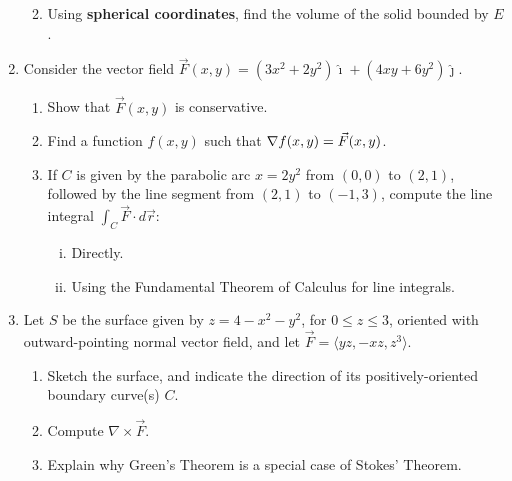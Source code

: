 \documentclass[12pt]{article}
\newcommand{\points}[1]{\marginpar{\hspace{24pt}[#1]}}
\begin{document}
\begin{enumerate}
\begin{enumerate}
\vspace{3.5in}

\item Using {\bf spherical coordinates}, find the volume of the solid bounded by $E$. \points{7}
\end{enumerate}

\newpage

\item Consider the vector field $\vec{F}(x,y) = (3x^2+2y^2)\hat{\imath} + 
(4xy+6y^2)\hat{\jmath}$.
	\begin{enumerate}
	
	\item Show that $\vec{F}(x,y)$ is conservative. \points{2}
\vspace{3in}
	\item Find a function $f(x,y)$ such that ${\bf \nabla} 
f(x,y) = \vec{F}(x,y)$.\points{5}
\newpage

	\item If $C$ is given by the parabolic arc $x=2y^2$ from $(0,0)$ 
to $(2,1)$, followed by the line segment from $(2,1)$ to $(-1,3)$, compute the line integral ${\displaystyle \int_C \vec{F}\cdot 
d\vec{r}}$:
	\begin{enumerate}[(i)]
	\item Directly. \points{7}

\vspace{5in}

	\item Using the Fundamental Theorem of Calculus for line 
integrals.\points{2}
\end{enumerate}
	\end{enumerate}
	
\newpage

\item Let $S$ be the surface given by $z=4-x^2-y^2$, for $0\leq z\leq 3$, oriented with outward-pointing normal vector field, and let $\vec{F} = \langle yz, -xz, z^3\rangle$.
\begin{enumerate}
\item Sketch the surface, and indicate the direction of its positively-oriented boundary curve(s) $C$. \points{3}


\vspace{3in}

\item Compute $\nabla\times\vec{F}$. \points{2}


\vspace{1.5in}

\item Explain why Green's Theorem is a special case of Stokes' Theorem. \points{4}


\end{enumerate}
\end{enumerate}
\end{document}
